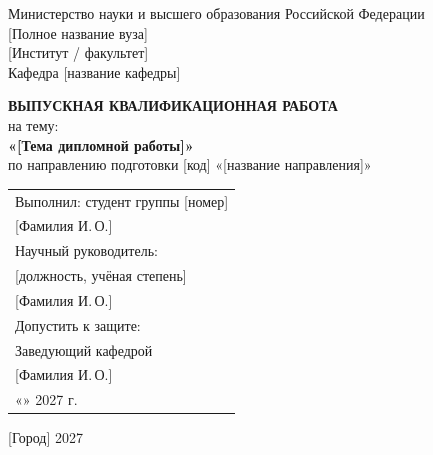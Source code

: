 \begin{titlepage}
\begin{center}
\singlespacing

Министерство науки и высшего образования Российской Федерации\\
{}[Полное название вуза]\\[1em]
{}[Институт / факультет]\\
Кафедра [название кафедры]

\vfill

{\bfseries ВЫПУСКНАЯ КВАЛИФИКАЦИОННАЯ РАБОТА}\\[1em]
на тему:\\
{\bfseries «[Тема дипломной работы]»}\\[1em]
по направлению подготовки [код] «[название направления]»

\vfill

\begin{flushright}
\begin{tabular}{@{}l@{}}
Выполнил: студент группы [номер]\\
\underline{\hspace{3cm}} [Фамилия И.\,О.]\\[1em]
Научный руководитель:\\
{}[должность, учёная степень]\\
\underline{\hspace{3cm}} [Фамилия И.\,О.]\\[1em]
Допустить к защите:\\
Заведующий кафедрой\\
\underline{\hspace{3cm}} [Фамилия И.\,О.]\\
«\underline{\hspace{1cm}}» \underline{\hspace{3cm}} 2027 г.
\end{tabular}
\end{flushright}

\vfill

{}[Город] 2027
\end{center}
\end{titlepage}
